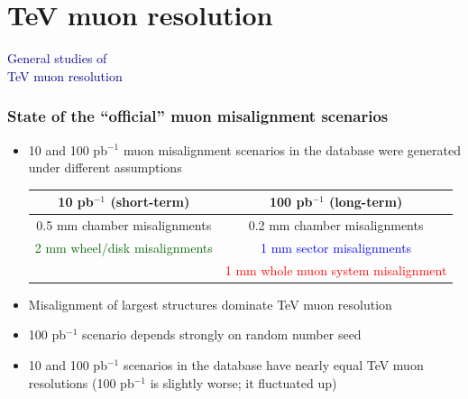 \documentclass[compress]{beamer}
\begin{document}
\section*{TeV muon resolution}

\begin{frame}
\begin{center}
\Huge \textcolor{darkblue}{General studies of \\ TeV muon resolution}
\end{center}
\end{frame}

\begin{frame}
\frametitle{State of the ``official'' muon misalignment scenarios}
\begin{itemize}\setlength{\itemsep}{0.3 cm}
\item 10 and 100 pb$^{-1}$ muon misalignment scenarios in the database were generated
under different assumptions

\vspace{0.1 cm}
\begin{center}
\scriptsize
\renewcommand{\arraystretch}{1.25}
\begin{tabular}{c | c}
10 pb$^{-1}$ (short-term) & 100 pb$^{-1}$ (long-term) \\\hline
0.5 mm chamber misalignments & 0.2 mm chamber misalignments \\
\textcolor{darkgreen}{2 mm wheel/disk misalignments} & \textcolor{blue}{1 mm sector misalignments} \\
& \textcolor{red}{1 mm whole muon system misalignment} \\
\end{tabular}
\end{center}

\vspace{0. cm}
\item Misalignment of largest structures dominate TeV muon resolution
\item 100 pb$^{-1}$ scenario depends strongly on random number seed
\item 10 and 100 pb$^{-1}$ scenarios in the database have nearly equal
TeV muon resolutions (100 pb$^{-1}$ is slightly worse; it fluctuated up)
\end{itemize}
\end{frame}

\end{document}
